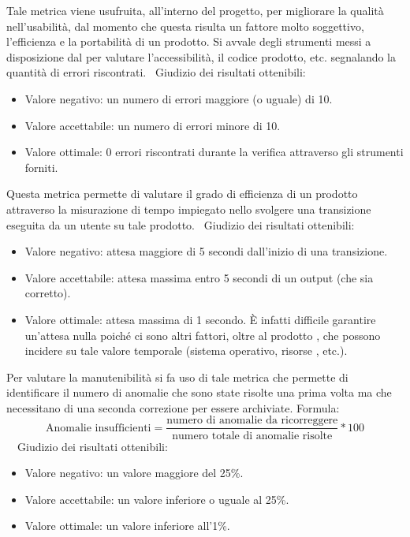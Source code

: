 \documentclass[a4paper, titlepage]{article}
\begin{document}
\label{par:web}
Tale metrica viene usufruita, all'interno del progetto, per migliorare la qualità nell'usabilità, dal momento che questa risulta un fattore molto soggettivo, l'efficienza e la portabilità di un prodotto.
Si avvale degli strumenti messi a disposizione dal  per valutare l'accessibilità, il codice  prodotto, etc. segnalando la quantità di errori riscontrati.
\
\newline Giudizio dei risultati ottenibili:
\begin{itemize}
\item Valore negativo: un numero di errori maggiore (o uguale) di 10.
\item Valore accettabile: un numero di errori minore di 10.
\item Valore ottimale: 0 errori riscontrati durante la verifica attraverso gli strumenti forniti.
\end{itemize}

\label{par:greff}
Questa metrica permette di valutare il grado di efficienza di un prodotto attraverso la misurazione di tempo impiegato nello svolgere una transizione eseguita da un utente su tale prodotto.
\
\newline Giudizio dei risultati ottenibili:
\begin{itemize}
\item Valore negativo: attesa maggiore di 5 secondi dall'inizio di una transizione.
\item Valore accettabile: attesa massima entro 5 secondi di un output (che sia corretto).
\item Valore ottimale: attesa massima di 1 secondo. È infatti difficile garantire un'attesa nulla poiché ci sono altri fattori, oltre al prodotto , che possono incidere su tale valore temporale (sistema operativo, risorse , etc.). 
\end{itemize}

\label{par:anins}
Per valutare la manutenibilità si fa uso di tale metrica che permette di identificare il numero di anomalie che sono state risolte una prima volta ma che necessitano di una seconda correzione per essere archiviate.
\newline Formula:
\begin{displaymath}
\mbox{Anomalie insufficienti}=\frac{\mbox{numero di anomalie da ricorreggere}}{\mbox{numero totale di anomalie risolte}}*100
\end{displaymath}
\
\
\newline Giudizio dei risultati ottenibili:
\begin{itemize}
\item Valore negativo: un valore maggiore del 25\%.
\item Valore accettabile: un valore inferiore o uguale al 25\%.
\item Valore ottimale: un valore inferiore all'1\%.
\end{itemize}
\end{document}
